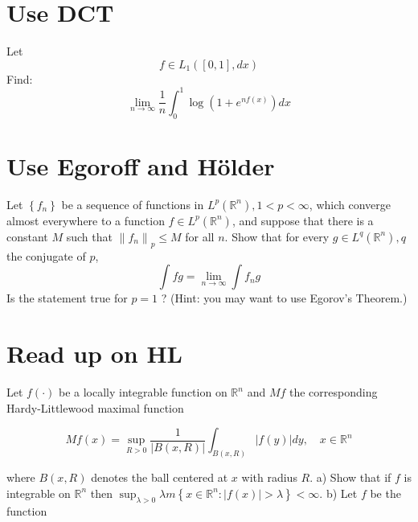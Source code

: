 \documentclass[lang=cn,11pt]{elegantbook}
\begin{document}
\section{Use DCT}
Let \[
f \in L_1([0,1], d x)
\]
Find: $$
\lim _{n \rightarrow \infty} \frac{1}{n} \int_0^1 \log \left(1+e^{n f(x)}\right) d x
$$\newline
\newline
\newline
\newline
\newline
\newline
\newline
\newline
\newline





\section{Use Egoroff and Hölder}
Let $\left\{f_n\right\}$ be a sequence of functions in $L^p\left(\mathbb{R}^n\right), 1<p<\infty$, which converge almost everywhere to a function $f \in L^p\left(\mathbb{R}^n\right)$, and suppose that there is a constant $M$ such that $\left\|f_n\right\|_p \leq M$ for all $n$. Show that for every $g \in L^q\left(\mathbb{R}^n\right), q$ the conjugate of $p$, $$
\int f g=\lim _{n \rightarrow \infty} \int f_n g
$$
Is the statement true for $p=1$ ?
(Hint: you may want to use Egorov's Theorem.)\newline
\newline
\newline
\newline
\newline
\newline
\newline
\newline
\newline




\section{Read up on HL}
Let $f(\cdot)$ be a locally integrable function on $\mathbb{R}^n$ and $M f$ the corresponding Hardy-Littlewood maximal function

$$
M f(x)=\sup _{R>0} \frac{1}{|B(x, R)|} \int_{B(x, R)}|f(y)| d y, \quad x \in \mathbb{R}^n
$$

where $B(x, R)$ denotes the ball centered at $x$ with radius $R$.
a) Show that if $f$ is integrable on $\mathbb{R}^n$ then $\sup _{\lambda>0} \lambda m\left\{x \in \mathbb{R}^n:|f(x)|>\lambda\right\}<\infty$.
b) Let $f$ be the function
\end{document}
